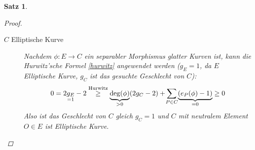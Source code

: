 \documentclass[english, german, parskip=half]{scrartcl}
\newtheorem{Satz}{Satz}[section]
\theoremstyle{definition}
\theoremstyle{remark}
\renewcommand{\O}{O}
\begin{document}
\begin{Satz}
\begin{proof}
\begin{description}
    \item[$C$ Elliptische Kurve]
      Nachdem $\phi\colon E\to C$ ein separabler Morphismus glatter
      Kurven ist, kann die Hurwitz'sche Formel \autoref{hurwitz}
      angewendet werden ($g_E=1$, da $E$ Elliptische Kurve, $g_C$ ist das
      gesuchte Geschlecht von $C$):
      \begin{align*}
        0
        = 2\underset{=1}{g_E}-2
        &\overset{\text{Hurwitz}}{\geq}
          \underbrace{\deg(\phi)}_{>0} (2g_C-2) 
          + \sum_{\mathclap{P\in C}}\underbrace{(e_P(\phi)-1)}_{=0}
          \geq 0\\
      \end{align*}
      Also ist das Geschlecht von $C$ gleich $g_C=1$ und $C$ mit
      neutralem Element $\O\in E$ ist Elliptische Kurve.
    \end{description}
  \end{proof}

\end{Satz}


\nocite{*}
\printbibliography
\end{document}

